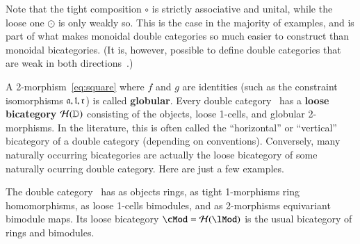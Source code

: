 Note that the tight composition $\circ$ is strictly associative and
unital, while the loose one $\odot$ is only weakly so.  This is
the case in the majority of examples, and is part of what makes monoidal double categories so much easier to construct than monoidal bicategories.
(It is, however, possible to define double categories that are weak in both directions~\cite{verity:base-change}.)



A 2-morphism~\eqref{eq:square} where $f$ and $g$ are identities (such
as the constraint isomorphisms $\mathfrak{a},\mathfrak{l},\mathfrak{r}$) is called
\textbf{globular}.  Every double category \lD\ has a
\textbf{loose bicategory} $\mathcal{H}(\mathbb{D})$ consisting of the objects,
loose 1-cells, and globular 2-morphisms.  In the literature, this is often called the ``horizontal'' or ``vertical'' bicategory of a double category (depending on conventions). Conversely, many naturally
occurring bicategories are actually the loose bicategory of some
naturally ocurring double category.  Here are just a few examples.

\begin{eg}
  The double category \lMod\ has as objects rings, as tight 1-morphisms ring
  homomorphisms, as loose 1-cells bimodules, and as 2-morphisms equivariant
  bimodule maps.  Its loose bicategory $\cMod = \cH(\lMod)$ is
  the usual bicategory of rings and bimodules.%
\end{eg}

